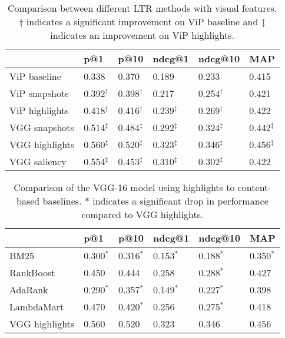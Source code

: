 
\begin{table}[h]
\caption{Comparison between different \ac{LTR} methods with visual features. $\dagger$ indicates a significant improvement on ViP baseline and $\ddagger$ indicates an improvement on ViP highlights.}
\label{tab:visresults}
\centering
\begin{tabular}{llllll}
\toprule
                      & p@1    & p@10  & ndcg@1  & ndcg@10 & MAP   \\ 
\midrule
ViP baseline          & 0.338  & 0.370 & 0.189   & 0.233   & 0.415 \\ 
\midrule
ViP snapshots         & 0.392$^\dagger$ & 0.398$^\dagger$ & 0.217   & 0.254$^\dagger$   & 0.421 \\ 
ViP highlights        & 0.418$^\dagger$  & 0.416$^\dagger$ & 0.239$^\dagger$   & 0.269$^\dagger$   & 0.422 \\
\midrule
VGG snapshots      & 0.514$^\ddagger$    & 0.484$^\ddagger$ & 0.292$^\ddagger$   & 0.324$^\ddagger$   & 0.442$^\ddagger$ \\ 
VGG highlights     & 0.560$^\ddagger$    & 0.520$^\ddagger$ & 0.323$^\ddagger$   & 0.346$^\ddagger$   & 0.456$^\ddagger$ \\ 
\midrule
VGG saliency       & 0.554$^\ddagger$    & 0.453$^\ddagger$ & 0.310$^\ddagger$   & 0.302$^\ddagger$   & 0.422 \\ 
\bottomrule
\end{tabular}
\end{table}

\begin{table}[h]
\caption{Comparison of the VGG-16 model using highlights to content-based baselines. $*$ indicates a significant drop in performance compared to VGG highlights. }

\label{tab:baseresults}
\begin{tabular}{llllll}
\toprule
                      & p@1    & p@10  & ndcg@1  & ndcg@10 & MAP   \\
\midrule
BM25                  & 0.300$^*$  & 0.316$^*$ & 0.153$^*$   & 0.188$^*$   & 0.350$^*$ \\ 
\midrule
RankBoost             & 0.450  & 0.444 & 0.258   & 0.288$^*$    & 0.427 \\
AdaRank               & 0.290$^*$   & 0.357$^*$  & 0.149$^*$    & 0.227$^*$    & 0.398 \\
LambdaMart            & 0.470  & 0.420$^*$ & 0.256   & 0.275$^*$    & 0.418 \\ 
\midrule
VGG highlights        & 0.560  & 0.520 & 0.323   & 0.346   & 0.456 \\ 
\bottomrule
\end{tabular}
\end{table}



